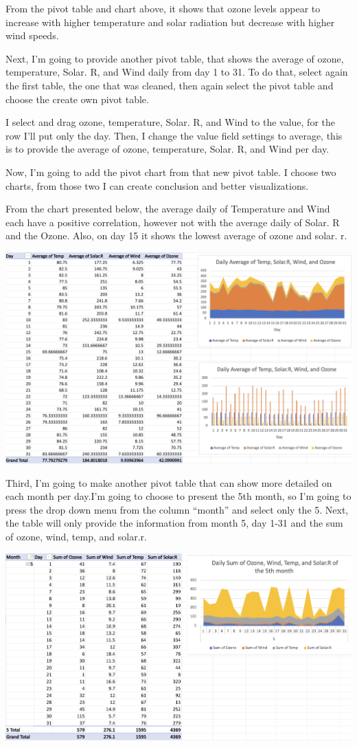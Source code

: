\documentclass[
  letterpaper,
  DIV=11,
  numbers=noendperiod]{scrreprt}
\begin{document}
From the pivot table and chart above, it shows that ozone levels appear
to increase with higher temperature and solar radiation but decrease
with higher wind speeds.

Next, I'm going to provide another pivot table, that shows the average
of ozone, temperature, Solar. R, and Wind daily from day 1 to 31. To do
that, select again the first table, the one that was cleaned, then again
select the pivot table and choose the create own pivot table.

I select and drag ozone, temperature, Solar. R, and Wind to the value,
for the row I'll put only the day. Then, I change the value field
settings to average, this is to provide the average of ozone,
temperature, Solar. R, and Wind per day.

Now, I'm going to add the pivot chart from that new pivot table. I
choose two charts, from those two I can create conclusion and better
visualizations.

From the chart presented below, the average daily of Temperature and
Wind each have a positive correlation, however not with the average
daily of Solar. R and the Ozone. Also, on day 15 it shows the lowest
average of ozone and solar. r.

\includegraphics{./pivot2.png}

Third, I'm going to make another pivot table that can show more detailed
on each month per day.I'm going to choose to present the 5th month, so
I'm going to press the drop down menu from the column ``month'' and
select only the 5. Next, the table will only provide the information
from month 5, day 1-31 and the sum of ozone, wind, temp, and solar.r.

\includegraphics{./pivot3.png}
\end{document}
